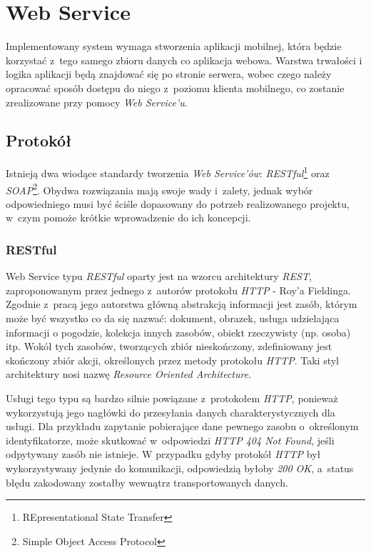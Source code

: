 \documentclass[11pt]{aghdpl}
\begin{document}
\section{Web Service}

Implementowany system wymaga stworzenia aplikacji mobilnej, która będzie korzystać z~tego samego zbioru danych co aplikacja webowa. Warstwa trwałości i logika aplikacji będą znajdować się po stronie serwera, wobec czego należy opracować sposób dostępu do niego z~poziomu klienta mobilnego, co zostanie zrealizowane przy pomocy \emph{Web Service'u}.

\subsection{Protokół}

Istnieją dwa wiodące standardy tworzenia \emph{Web Service'ów}: \emph{RESTful}\footnote{REpresentational State Transfer} oraz \emph{SOAP}\footnote{Simple Object Access Protocol}. Obydwa rozwiązania mają swoje wady i~zalety, jednak wybór odpowiedniego musi być ściśle dopasowany do potrzeb realizowanego projektu, w~czym pomoże krótkie wprowadzenie do ich koncepcji.

\subsubsection{RESTful}

Web Service typu \emph{RESTful} oparty jest na wzorcu architektury \emph{REST}, zaproponowanym przez jednego z~autorów protokołu \emph{HTTP} - Roy'a Fieldinga. Zgodnie z~pracą \cite{RFD} jego autorstwa główną abstrakcją informacji jest zasób, którym może być wszystko co da się nazwać: dokument, obrazek, usługa udzielająca informacji o pogodzie, kolekcja innych zasobów, obiekt rzeczywisty (np. osoba) itp. Wokół tych zasobów, tworzących zbiór nieskończony, zdefiniowany jest skończony zbiór akcji, określonych przez metody protokołu \emph{HTTP}. Taki styl architektury nosi nazwę \emph{Resource Oriented Architecture}.

Usługi tego typu są bardzo silnie powiązane z~protokołem \emph{HTTP}, ponieważ wykorzystują jego nagłówki do przesyłania danych charakterystycznych dla usługi. Dla przykładu zapytanie pobierające dane pewnego zasobu o~określonym identyfikatorze, może skutkować w~odpowiedzi \emph{HTTP 404 Not Found}, jeśli odpytywany zasób nie istnieje. W przypadku gdyby protokół \emph{HTTP} był wykorzystywany jedynie do komunikacji, odpowiedzią byłoby \emph{200 OK}, a~status błędu zakodowany zostałby wewnątrz transportowanych danych.
\end{document}
